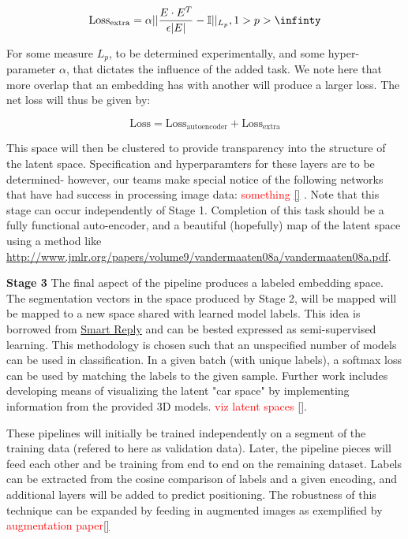 \documentclass[twocolumn]{article}
\newcommand{\todo}[1]{\textcolor{red}{#1}}
\begin{document}
  $$\text{Loss}_\text{extra} = \alpha ||\frac{E\cdot E^T}{\epsilon |E|} - \mathbb{I}||_{L_p}, 1 > p > \infinty$$

  For some measure $L_p$, to be determined experimentally, and some
  hyper-parameter $\alpha$, that dictates the influence of the added task. We
  note here that more overlap that an embedding has with another will produce a
  larger loss. The net loss will thus be given by:

  $$\text{Loss} = \text{Loss}_\text{autoencoder} + \text{Loss}_\text{extra}$$

  This space will then be clustered to provide transparency into the structure
  of the latent space.  Specification and hyperparamters for these layers are to be determined-
  however, our teams make special notice of the following networks that have had
  success in processing image data: \todo{something \ref{}} . Note that this stage can occur
  independently of Stage 1. Completion of this task should be a fully functional
  auto-encoder, and a beautiful (hopefully) map of the latent space using a
  method like
  \href{tsne}{http://www.jmlr.org/papers/volume9/vandermaaten08a/vandermaaten08a.pdf}.

  \textbf{Stage 3} The final aspect of the pipeline produces a labeled embedding
  space.
  The segmentation vectors in the space produced by Stage 2, will be mapped will
  be mapped to a new space shared with learned model labels. This
  idea is borrowed from \href{https://arxiv.org/pdf/1705.00652.pdf}{Smart Reply} and can be bested expressed as semi-supervised
  learning. This methodology is chosen such that an unspecified number of models
  can be used in classification. In a given batch (with unique labels), a
  softmax loss can be used by matching the labels to the given sample.
  Further work includes developing means of
  visualizing the latent "car space" by implementing information from the
  provided 3D models.  \todo{viz latent spaces \ref{}}.

  These pipelines will initially be trained independently on a segment of the
  training data (refered to here as validation data). Later, the pipeline pieces
  will feed each other and be training from end to end on the remaining dataset.
  Labels can be extracted from the cosine comparison of labels and a given
  encoding, and additional layers will be added to predict positioning. The
  robustness of this technique can be expanded by feeding in augmented images as
  exemplified by \todo{augmentation paper\ref{}}
\end{document}
